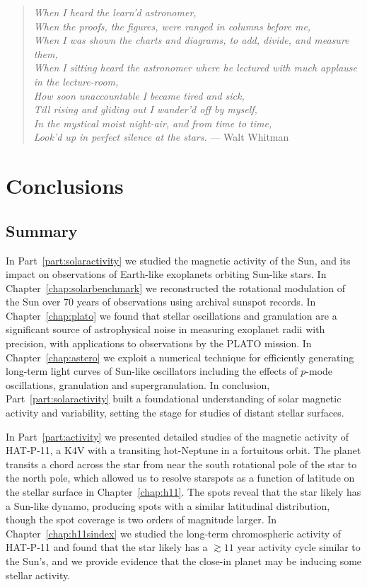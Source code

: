 
\begin{verse}
{\it When I heard the learn'd astronomer,\\
When the proofs, the figures, were ranged in columns before me,\\
When I was shown the charts and diagrams, to add, divide, and measure them,\\
When I sitting heard the astronomer where he lectured with much applause in the lecture-room,\\
How soon unaccountable I became tired and sick,\\
Till rising and gliding out I wander'd off by myself,\\
In the mystical moist night-air, and from time to time,\\
Look'd up in perfect silence at the stars.\it}
\hfill --- Walt Whitman
\end{verse}

\chapter{Conclusions}

\section{Summary}

In Part~\ref{part:solaractivity} we studied the magnetic activity of the Sun, and its impact on observations of Earth-like exoplanets orbiting Sun-like stars. In Chapter~\ref{chap:solarbenchmark} we reconstructed the rotational modulation of the Sun over 70 years of observations using archival sunspot records. In Chapter~\ref{chap:plato} we found that stellar oscillations and granulation are a significant source of astrophysical noise in measuring exoplanet radii with precision, with applications to observations by the PLATO mission. In Chapter~\ref{chap:astero} we exploit a numerical technique for efficiently generating long-term light curves of Sun-like oscillators including the effects of $p$-mode oscillations, granulation and supergranulation. In conclusion, Part~\ref{part:solaractivity} built a foundational understanding of solar magnetic activity and variability, setting the stage for studies of distant stellar surfaces.

In Part~\ref{part:activity} we presented detailed studies of the magnetic activity of HAT-P-11, a K4V with a transiting hot-Neptune in a fortuitous orbit. The planet transits a chord across the star from near the south rotational pole of the star to the north pole, which allowed us to resolve starspots as a function of latitude on the stellar surface in Chapter~\ref{chap:h11}. The spots reveal that the star likely has a Sun-like dynamo, producing spots with a similar latitudinal distribution, though the spot coverage is two orders of magnitude larger. In Chapter~\ref{chap:h11sindex} we studied the long-term chromospheric activity of HAT-P-11 and found that the star likely has a $\gtrsim11$ year activity cycle similar to the Sun's, and we provide evidence that the close-in planet may be inducing some stellar activity. 

